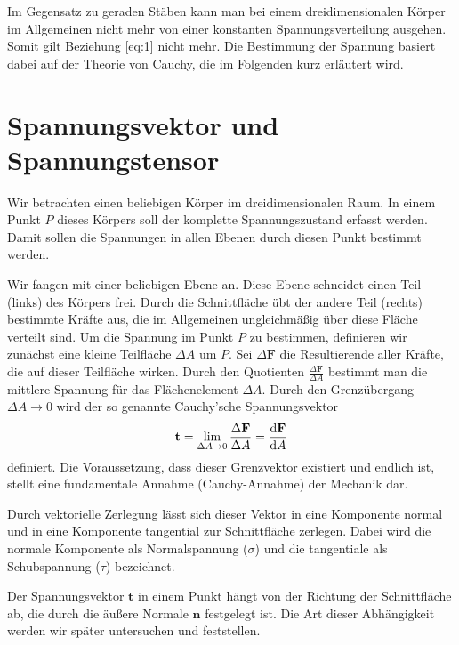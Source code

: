 \documentclass{lecture}
\begin{document}
    Im Gegensatz zu geraden Stäben kann man bei einem dreidimensionalen Körper im Allgemeinen nicht mehr von einer konstanten Spannungsverteilung ausgehen.
    Somit gilt Beziehung \eqref{eq:1} nicht mehr.
    Die Bestimmung der Spannung basiert dabei auf der Theorie von Cauchy, die im Folgenden kurz erläutert wird.


    \section*{Spannungsvektor und Spannungstensor}

    Wir betrachten einen beliebigen Körper im dreidimensionalen Raum.
    In einem Punkt \(P\) dieses Körpers soll der komplette Spannungszustand erfasst werden.
    Damit sollen die Spannungen in allen Ebenen durch diesen Punkt bestimmt werden.


    Wir fangen mit einer beliebigen Ebene an.
    Diese Ebene schneidet einen Teil (links) des Körpers frei.
    Durch die Schnittfläche übt der andere Teil (rechts) bestimmte Kräfte aus, die im Allgemeinen ungleichmäßig über diese Fläche verteilt sind.
    Um die Spannung im Punkt \(P\) zu bestimmen, definieren wir zunächst eine kleine Teilfläche \(\Delta A\) um \(P\).
    Sei \(\Delta\mathbf{F}\) die Resultierende aller Kräfte, die auf dieser Teilfläche wirken.
    Durch den Quotienten \(\frac{\Delta\mathbf{F}}{\Delta A}\) bestimmt man die mittlere Spannung für das Flächenelement \(\Delta A\).
    Durch den Grenzübergang \(\Delta A \to 0\) wird der so genannte Cauchy'sche Spannungsvektor
    \begin{equation}\label{eq:2}
        \mathbf{t} = \lim_{\Delta A \to 0}\frac{\Delta\mathbf{F}}{\Delta A} = \frac{\mathop{\mathrm{d}\!}\mathbf{F}}{\mathop{\mathrm{d}\!} A}
    \end{equation}
    definiert.
    Die Voraussetzung, dass dieser Grenzvektor existiert und endlich ist, stellt eine fundamentale Annahme (Cauchy-Annahme) der Mechanik dar.

    Durch vektorielle Zerlegung lässt sich dieser Vektor in eine Komponente normal und in eine Komponente tangential zur Schnittfläche zerlegen.
    Dabei wird die normale Komponente als Normalspannung (\(\sigma\)) und die tangentiale als Schubspannung (\(\tau\)) bezeichnet.

    Der Spannungsvektor \(\mathbf{t}\) in einem Punkt hängt von der Richtung der Schnittfläche ab, die durch die äußere Normale \(\mathbf{n}\) festgelegt ist.
    Die Art dieser Abhängigkeit werden wir später untersuchen und feststellen.
\end{document}
